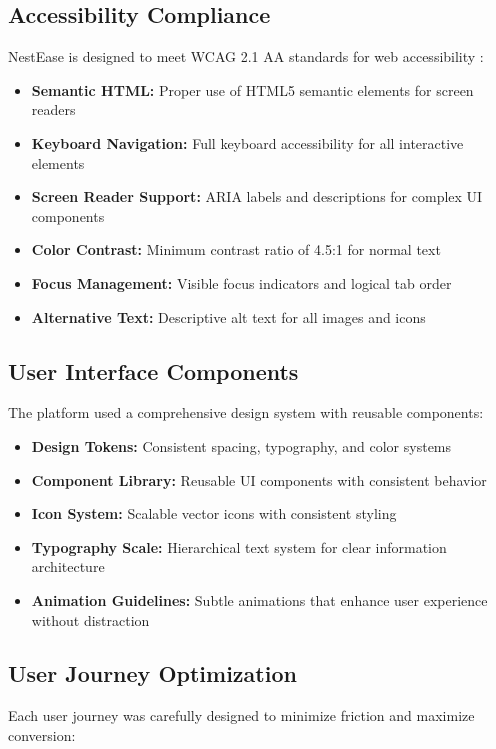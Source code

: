 \documentclass[conference]{IEEEtran}
\begin{document}
\subsection{Accessibility Compliance}
NestEase is designed to meet WCAG 2.1 AA standards for web accessibility \cite{accessibility_standards}:

\begin{itemize}
    \item \textbf{Semantic HTML:} Proper use of HTML5 semantic elements for screen readers
    \item \textbf{Keyboard Navigation:} Full keyboard accessibility for all interactive elements
    \item \textbf{Screen Reader Support:} ARIA labels and descriptions for complex UI components
    \item \textbf{Color Contrast:} Minimum contrast ratio of 4.5:1 for normal text
    \item \textbf{Focus Management:} Visible focus indicators and logical tab order
    \item \textbf{Alternative Text:} Descriptive alt text for all images and icons
\end{itemize}

\subsection{User Interface Components}
The platform used a comprehensive design system with reusable components:

\begin{itemize}
    \item \textbf{Design Tokens:} Consistent spacing, typography, and color systems
    \item \textbf{Component Library:} Reusable UI components with consistent behavior
    \item \textbf{Icon System:} Scalable vector icons with consistent styling
    \item \textbf{Typography Scale:} Hierarchical text system for clear information architecture
    \item \textbf{Animation Guidelines:} Subtle animations that enhance user experience without distraction
\end{itemize}

\subsection{User Journey Optimization}
Each user journey was carefully designed to minimize friction and maximize conversion:
\end{document}
